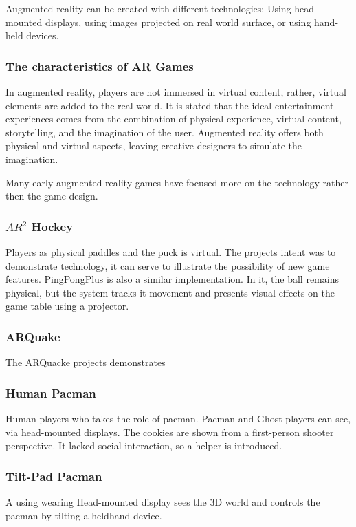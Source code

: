     Augmented reality can be created with different technologies:
    Using head-mounted displays, using images projected on real world surface, or using hand-held devices. 

      \subsubsection*{The characteristics of AR Games}
      In augmented reality, players are not immersed in virtual content, rather, virtual elements are added to the real world. It is stated that the ideal entertainment experiences comes from the combination of physical experience, virtual content, storytelling, and the imagination of the user. Augmented reality offers both physical and virtual aspects, leaving creative designers to simulate the imagination. 

      Many early augmented reality games have focused more on the technology rather then the game design. 

      \subsubsection*{$AR^{2}$ Hockey}
      Players as physical paddles and the puck is virtual. The projects intent was to demonstrate technology, it can serve to illustrate the possibility of new game features. PingPongPlus is also a similar implementation. In it, the ball remains physical, but the system tracks it movement and presents visual effects on the game table using a projector. 

      \subsubsection*{ARQuake}
      The ARQuacke projects demonstrates 

      \subsubsection*{Human Pacman}
      Human players who takes the role of pacman. Pacman and Ghost players can see, via head-mounted displays. The cookies are shown from a first-person shooter perspective. It lacked social interaction, so a helper is introduced.  

      \subsubsection*{Tilt-Pad Pacman}
      A using wearing Head-mounted display sees the 3D world and controls the pacman by tilting a heldhand device. 

